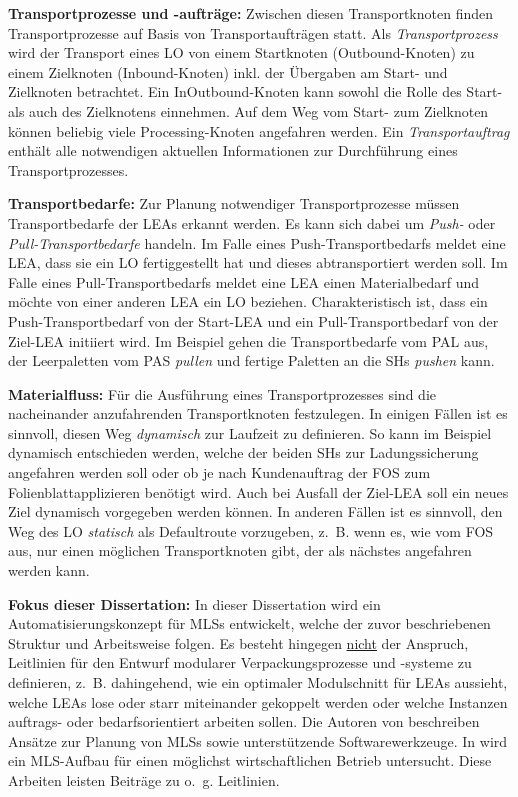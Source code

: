 \textbf{Transportprozesse und -aufträge:} Zwischen diesen Transportknoten finden Transportprozesse auf Basis von Transportaufträgen statt. Als \emph{Transportprozess} wird der Transport eines LO von einem Startknoten (Outbound-Knoten) zu einem Zielknoten (Inbound-Knoten) inkl. der Übergaben am Start- und Zielknoten betrachtet. Ein InOutbound-Knoten kann sowohl die Rolle des Start- als auch des Zielknotens einnehmen. Auf dem Weg vom Start- zum Zielknoten können beliebig viele Processing-Knoten angefahren werden. Ein \emph{Transportauftrag} enthält alle notwendigen aktuellen Informationen zur Durchführung eines Transportprozesses.

\textbf{Transportbedarfe:} Zur Planung notwendiger Transportprozesse müssen Transportbedarfe der LEAs erkannt werden. Es kann sich dabei um \emph{Push-} oder \emph{Pull-Transportbedarfe} handeln. Im Falle eines Push-Transportbedarfs meldet eine LEA, dass sie ein LO fertiggestellt hat und dieses abtransportiert werden soll. Im Falle eines Pull-Transportbedarfs meldet eine LEA einen Materialbedarf und möchte von einer anderen LEA ein LO beziehen. Charakteristisch ist, dass ein Push-Transportbedarf von der Start-LEA und ein Pull-Transportbedarf von der Ziel-LEA initiiert wird. Im Beispiel gehen die Transportbedarfe vom PAL aus, der Leerpaletten vom PAS \emph{pullen} und fertige Paletten an die SHs \emph{pushen} kann.

\textbf{Materialfluss:} Für die Ausführung eines Transportprozesses sind die nacheinander anzufahrenden Transportknoten festzulegen. In einigen Fällen ist es sinnvoll, diesen Weg \emph{dynamisch} zur Laufzeit zu definieren. So kann im Beispiel dynamisch entschieden werden, welche der beiden SHs zur Ladungssicherung angefahren werden soll oder ob je nach Kundenauftrag der FOS zum Folienblattapplizieren benötigt wird. Auch bei Ausfall der Ziel-LEA soll ein neues Ziel dynamisch vorgegeben werden können. In anderen Fällen ist es sinnvoll, den Weg des LO \emph{statisch} als Defaultroute vorzugeben, z.~B. wenn es, wie vom FOS aus, nur einen möglichen Transportknoten gibt, der als nächstes angefahren werden kann.

\begin{graybox}
	\textbf{Fokus dieser Dissertation:} In dieser Dissertation wird ein Automatisierungskonzept für MLSs entwickelt, welche der zuvor beschriebenen Struktur und Arbeitsweise folgen. Es besteht hingegen \underline{nicht} der Anspruch, Leitlinien für den Entwurf modularer Verpackungsprozesse und -systeme zu definieren, z.~B. dahingehend, wie ein optimaler Modulschnitt für LEAs aussieht, welche LEAs lose oder starr miteinander gekoppelt werden oder welche Instanzen auftrags- oder bedarfsorientiert arbeiten sollen. Die Autoren von \cite{Jurgensmeyer.2020,Pannok.2021,Gryczycha.2023,Gryczycha.2025,Borgmann.2025} beschreiben Ansätze zur Planung von MLSs sowie unterstützende Softwarewerkzeuge. In \cite{Pannok.2023,Pannok.2024} wird ein MLS-Aufbau für einen möglichst wirtschaftlichen Betrieb untersucht. Diese Arbeiten leisten Beiträge zu o.~g. Leitlinien.
\end{graybox}


